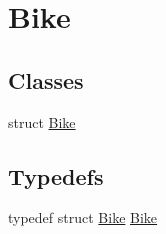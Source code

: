 \hypertarget{group__Bike}{}\section{Bike}
\label{group__Bike}
\subsection*{Classes}
\begin{DoxyCompactItemize}
\item 
struct \hyperlink{structBike}{Bike}
\end{DoxyCompactItemize}
\subsection*{Typedefs}
\begin{DoxyCompactItemize}
\item 
typedef struct \hyperlink{structBike}{Bike} \hyperlink{group__Bike_ga85f4cbf9698a8ed38ad74f4e2d71341e}{Bike}
\end{DoxyCompactItemize}
